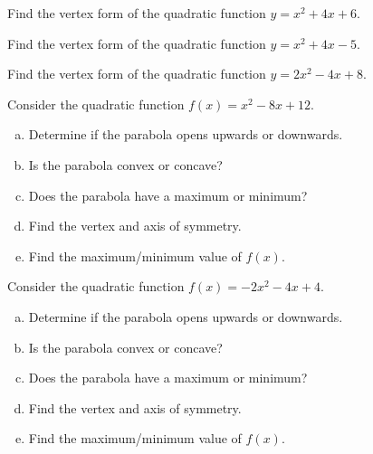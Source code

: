 \documentclass[11pt,letterpaper]{article}
\begin{document}

 Find the vertex form of the quadratic function $y= x^2 + 4x + 6$.





\newpage





 Find the vertex form of the quadratic function $y= x^2 + 4x - 5$.





\newpage





 Find the vertex form of the quadratic function $y= 2x^2 - 4x + 8$.





\newpage





 Consider the quadratic function $f(x)= x^2 - 8x + 12$.
\begin{enumerate}[(a)]
\item Determine if the parabola opens upwards or downwards.
\item Is the parabola convex or concave?
\item Does the parabola have a maximum or minimum? 
\item Find the vertex and axis of symmetry. 
\item Find the maximum/minimum value of $f(x)$. 
\end{enumerate}





\newpage





 Consider the quadratic function $f(x)= -2x^2 - 4x + 4$.
\begin{enumerate}[(a)]
\item Determine if the parabola opens upwards or downwards.
\item Is the parabola convex or concave?
\item Does the parabola have a maximum or minimum? 
\item Find the vertex and axis of symmetry. 
\item Find the maximum/minimum value of $f(x)$. 
\end{enumerate}








\end{document}
